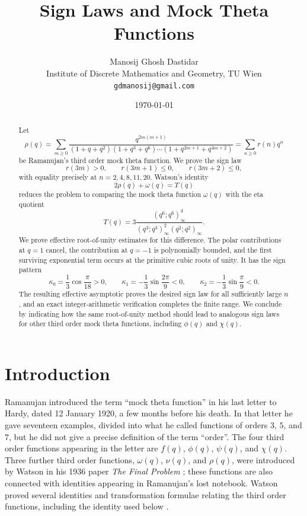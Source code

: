 \documentclass[11pt]{article}
\title{Sign Laws and Mock Theta Functions}
\author{Manosij Ghosh Dastidar\\
Institute of Discrete Mathematics and Geometry, TU Wien\\
\texttt{gdmanosij@gmail.com}}
\date{\today}
\theoremstyle{remark}
\begin{document}
\maketitle


\begin{abstract}
Let
\[
\rho(q)=\sum_{m\geq 0}\frac{q^{2m(m+1)}}{(1+q+q^2)(1+q^3+q^6)\cdots(1+q^{2m+1}+q^{4m+2})}
      =\sum_{n\geq 0}r(n)q^n
\]
be Ramanujan's third order mock theta function. We prove the sign law
\[
r(3m)>0,\qquad r(3m+1)\leq 0,\qquad r(3m+2)\leq 0,
\]
with equality precisely at $n=2,4,8,11,20$. Watson's identity
\[
2\rho(q)+\omega(q)=T(q)
\]
reduces the problem to comparing the mock theta function $\omega(q)$ with the eta quotient
\[
T(q)=3\frac{(q^6;q^6)_\infty^4}{(q^3;q^3)_\infty^2(q^2;q^2)_\infty}.
\]
We prove effective root-of-unity estimates for this difference. The polar contributions at $q=1$ cancel, the contribution at $q=-1$ is polynomially bounded, and the first surviving exponential term occurs at the primitive cubic roots of unity. It has the sign pattern
\[
\kappa_0=\frac13\cos\frac\pi{18}>0,\qquad
\kappa_1=-\frac13\sin\frac{2\pi}{9}<0,
\qquad
\kappa_2=-\frac13\sin\frac\pi9<0.
\]
The resulting effective asymptotic proves the desired sign law for all sufficiently large $n$, and an exact integer-arithmetic verification completes the finite range. We conclude by indicating how the same root-of-unity method should lead to analogous sign laws for other third order mock theta functions, including $\phi(q)$ and $\chi(q)$.
\end{abstract}




\section{Introduction}

Ramanujan introduced the term ``mock theta function'' in his last letter to Hardy, dated 12 January 1920, a few months before his death.  In that letter he gave seventeen examples, divided into what he called functions of orders $3$, $5$, and $7$, but he did not give a precise definition of the term ``order''.  The four third order functions appearing in the letter are $f(q)$, $\phi(q)$, $\psi(q)$, and $\chi(q)$.  Three further third order functions, $\omega(q)$, $\nu(q)$, and $\rho(q)$, were introduced by Watson in his 1936 paper \emph{The Final Problem} \cite{Watson}; these functions are also connected with identities appearing in Ramanujan's lost notebook.  Watson proved several identities and transformation formulae relating the third order functions, including the identity used below \cite{Watson,Zagier}.
\end{document}
